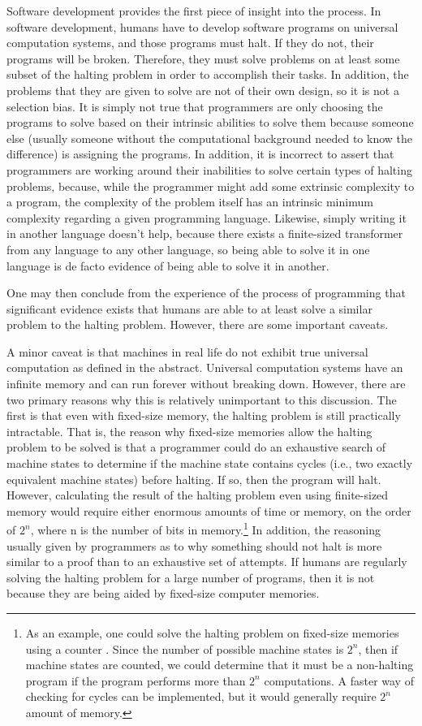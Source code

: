 Software development provides the first piece of insight into the process. In software development, humans have to develop software programs on universal computation systems, and those programs must halt.  If they do not, their programs will be broken.  Therefore, they must solve problems on at least some subset of the halting problem in order to accomplish their tasks.  In addition, the problems that they are given to solve are not of their own design, so it is not a selection bias.  It is simply not true that programmers are only choosing the programs to solve based on their intrinsic abilities to solve them because someone else (usually someone without the computational background needed to know the difference) is assigning the programs.  In addition, it is incorrect to assert that programmers are working around their inabilities to solve certain types of halting problems, because, while the programmer might add some extrinsic complexity to a program, the complexity of the problem itself has an intrinsic minimum complexity regarding a given programming language.  Likewise, simply writing it in another language doesn't help, because there exists a finite-sized transformer from any language to any other language, so being able to solve it in one language is de facto evidence of being able to solve it in another.

One may then conclude from the experience of the process of programming that significant evidence exists that humans are able to at least solve a similar problem to the halting problem.  However, there are some important caveats.

A minor caveat is that machines in real life do not exhibit true universal computation as defined in the abstract.  Universal computation systems have an infinite memory and can run forever without breaking down.  However, there are two primary reasons why this is relatively unimportant to this discussion.  The first is that even with fixed-size memory, the halting problem is still practically intractable.  That is, the reason why fixed-size memories allow the halting problem to be solved is that a programmer could do an exhaustive search of machine states to determine if the machine state contains cycles (i.e., two exactly equivalent machine states) before halting.  If so, then the program will halt.  However, calculating the result of the halting problem even using finite-sized memory would require either enormous amounts of time or memory, on the order of $2^n$, where n is the number of bits in memory.\footnote{As an example, one could solve the halting problem on fixed-size memories using a counter \citep{gurari1989}.  Since the number of possible machine states is $2^n$, then if machine states are counted, we could determine that it must be a non-halting program if the program performs more than $2^n$ computations.  A faster way of checking for cycles can be implemented, but it would generally require $2^n$ amount of memory.}  In addition, the reasoning usually given by programmers as to why something should not halt is more similar to a proof than to an exhaustive set of attempts.  If humans are regularly solving the halting problem for a large number of programs, then it is not because they are being aided by fixed-size computer memories.

